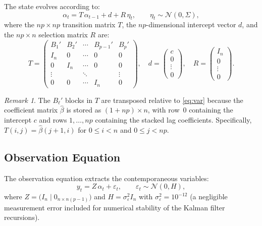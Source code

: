 \documentclass[11pt]{article}
\theoremstyle{definition}
\theoremstyle{remark}
\newtheorem{remark}{Remark}
\begin{document}
The state evolves according to:
\begin{equation}\label{eq:transition}
  \alpha_t = T\, \alpha_{t-1} + d + R\, \eta_t,
  \qquad \eta_t \sim \mathcal{N}(0, \Sigma),
\end{equation}
where the $np \times np$ transition matrix $T$, the $np$-dimensional
intercept vector $d$, and the $np \times n$ selection matrix $R$ are:
\begin{equation}\label{eq:companion}
  T = \begin{pmatrix}
    B_1' & B_2' & \cdots & B_{p-1}' & B_p' \\
    I_n  & 0    & \cdots & 0        & 0    \\
    0    & I_n  & \cdots & 0        & 0    \\
    \vdots & & \ddots & & \vdots \\
    0    & 0    & \cdots & I_n      & 0
  \end{pmatrix}, \quad
  d = \begin{pmatrix} c \\ 0 \\ \vdots \\ 0 \end{pmatrix}, \quad
  R = \begin{pmatrix} I_n \\ 0 \\ \vdots \\ 0 \end{pmatrix}.
\end{equation}

\begin{remark}
The $B_\ell'$ blocks in $T$ are transposed relative to \eqref{eq:var}
because the coefficient matrix $\hat\beta$ is stored as
$(1 + np) \times n$, with row~0 containing the intercept $c$ and
rows $1, \ldots, np$ containing the stacked lag coefficients.
Specifically, $T(i,j) = \hat\beta(j+1, i)$ for $0 \le i < n$ and
$0 \le j < np$.
\end{remark}

\subsection{Observation Equation}

The observation equation extracts the contemporaneous variables:
\begin{equation}\label{eq:obs}
  y_t = Z\, \alpha_t + \varepsilon_t,
  \qquad \varepsilon_t \sim \mathcal{N}(0, H),
\end{equation}
where $Z = \bigl(I_n \mid 0_{n \times n(p-1)}\bigr)$ and
$H = \sigma^2_\varepsilon I_n$ with $\sigma^2_\varepsilon = 10^{-12}$
(a negligible measurement error included for numerical stability of the
Kalman filter recursions).
\end{document}
